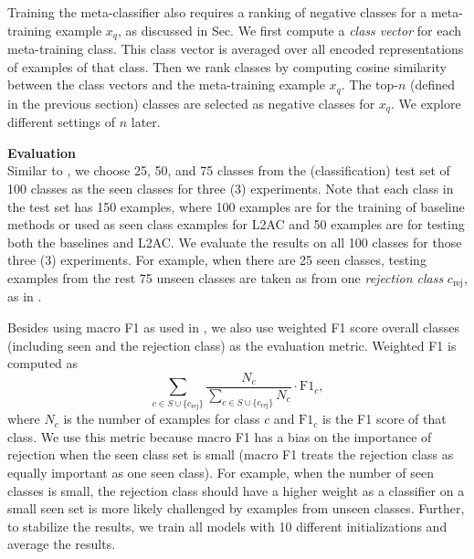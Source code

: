 Training the meta-classifier also requires a ranking of negative classes for a meta-training example $x_q$, as discussed in Sec. %
We first compute a \textit{class vector} for each meta-training class. 
This class vector is averaged over all encoded representations of examples of that class.
Then we rank classes by computing cosine similarity between the class vectors and the meta-training example $x_q$.
The top-$n$ (defined in the previous section) classes are selected as negative classes for $x_q$.
We explore different settings of $n$ later.

\textbf{Evaluation}\\
Similar to \cite{shu-xu-liu:2017:EMNLP2017}, we choose 25, 50, and 75 classes from the (classification) test set of 100 classes as the seen classes for three (3) experiments.
Note that each class in the test set has 150 examples, where 100 examples are for the training of baseline methods or used as seen class examples for L2AC and 50 examples are for testing both the baselines and L2AC.
We evaluate the results on all 100 classes for those three (3) experiments.
For example, when there are 25 seen classes, testing examples from the rest 75 unseen classes are taken as from one \textit{rejection class} $c_\text{rej}$, as in \cite{shu-xu-liu:2017:EMNLP2017}.

Besides using macro F1 as used in \cite{shu-xu-liu:2017:EMNLP2017}, we also use weighted F1 score overall classes (including seen and the rejection class) as the evaluation metric.
Weighted F1 is computed as 
\begin{equation}
\sum_{c\in S\cup\{c_\text{rej}\} } \frac{N_c}{\sum_{c\in S\cup\{c_\text{rej}\}}N_c  }\cdot \text{F1}_c,
\end{equation}
where $N_c$ is the number of examples for class $c$ and $\text{F1}_c$ is the F1 score of that class.
We use this metric because macro F1 has a bias on the importance of rejection when the seen class set is small (macro F1 treats the rejection class as equally important as one seen class).
For example, when the number of seen classes is small, the rejection class should have a higher weight as a classifier on a small seen set is more likely challenged by examples from unseen classes.
Further, to stabilize the results, we train all models with 10 different initializations and average the results.

